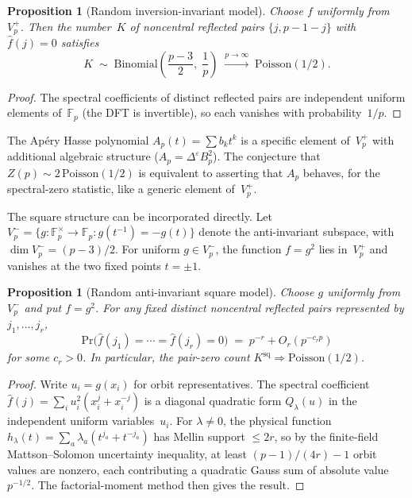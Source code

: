\documentclass[11pt]{article}
\newtheorem{proposition}[theorem]{Proposition}
\theoremstyle{definition}
\theoremstyle{remark}
\begin{document}
\begin{proposition}[Random inversion-invariant model]\label{prop:random}
Choose $f$ uniformly from~$V_p^+$.
Then the number~$K$ of noncentral reflected pairs
$\{j, p{-}1{-}j\}$ with $\hat{f}(j) = 0$ satisfies
\[
  K \;\sim\; \mathrm{Binomial}\!\left(
  \frac{p-3}{2},\;\frac{1}{p}\right)
  \;\xrightarrow{p \to \infty}\;
  \mathrm{Poisson}(1/2).
\]
\end{proposition}

\begin{proof}
The spectral coefficients of distinct reflected pairs
are independent uniform elements of~$\mathbb{F}_p$
(the DFT is invertible), so each vanishes with
probability~$1/p$.
\end{proof}

The Ap\'ery Hasse polynomial $A_p(t) = \sum b_k t^k$
is a specific element of~$V_p^+$ with additional
algebraic structure ($A_p = \Delta^\varepsilon B_p^2$).
The conjecture that $Z(p) \sim 2\,\mathrm{Poisson}(1/2)$
is equivalent to asserting that $A_p$ behaves, for
the spectral-zero statistic, like a generic element
of~$V_p^+$.

The square structure can be incorporated directly.
Let $V_p^- = \{g \colon \mathbb{F}_p^\times \to \mathbb{F}_p
: g(t^{-1}) = -g(t)\}$ denote the anti-invariant subspace,
with $\dim V_p^- = (p{-}3)/2$.
For uniform $g \in V_p^-$, the function $f = g^2$
lies in~$V_p^+$ and vanishes at the two fixed points
$t = \pm 1$.

\begin{proposition}[Random anti-invariant square model]%
\label{prop:random-sq}
Choose $g$ uniformly from~$V_p^-$ and put $f = g^2$.
For any fixed distinct noncentral reflected pairs
represented by $j_1, \ldots, j_r$,
\[
  \mathrm{Pr}\bigl(\hat{f}(j_1) = \cdots = \hat{f}(j_r) = 0\bigr)
  \;=\; p^{-r} + O_r(p^{-c_r p})
\]
for some $c_r > 0$.
In particular, the pair-zero count
$K^{\mathrm{sq}} \Rightarrow \mathrm{Poisson}(1/2)$.
\end{proposition}

\begin{proof}
Write $u_i = g(x_i)$ for orbit representatives.
The spectral coefficient
$\hat{f}(j) = \sum_i u_i^2(x_i^j + x_i^{-j})$
is a diagonal quadratic form $Q_\lambda(u)$ in
the independent uniform variables~$u_i$.
For $\lambda \ne 0$, the physical function
$h_\lambda(t) = \sum_a \lambda_a(t^{j_a} + t^{-j_a})$
has Mellin support $\le 2r$, so by the finite-field
Mattson--Solomon uncertainty inequality, at least
$(p{-}1)/(4r) - 1$ orbit values are nonzero,
each contributing a quadratic Gauss sum of
absolute value~$p^{-1/2}$.
The factorial-moment method then gives the result.
\end{proof}
\end{document}
